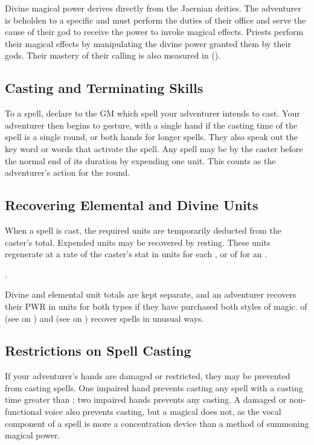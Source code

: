 \begin{multicols*}{2}
Divine magical power derives directly from the Jaernian deities. The adventurer is beholden to a specific  and must perform the duties of their office and serve the cause of their god to receive the power to invoke magical effects. Priests perform their magical effects by manipulating the divine power granted them by their gods. Their mastery of their calling is also measured in  (\DU).
\subsection{Casting and Terminating Skills}
To  a spell, declare to the GM which spell your adventurer intends to cast. Your adventurer then begins to gesture, with a single hand if the casting time of the spell is a single round, or both hands for longer spells. They also speak out the key word or words that activate the spell. Any spell may be  by the caster before
the normal end of its duration by expending one unit. This counts as the adventurer's action for the round.
\subsection{Recovering Elemental and Divine Units}
When a spell is cast, the required units are temporarily deducted from the caster's total. Expended units may be recovered by resting. These units regenerate at a rate of the caster's \PWR stat in units for each  , or  of  for an .

. 

Divine and elemental unit totals are kept separate, and an adventurer recovers their PWR in units for both types if they have purchased both styles of magic.  of  (see  on \pageref{ch:rudri}) and  (see  on \pageref{ch:rudri}) recover spells in unusual ways.
\subsection{Restrictions on Spell Casting}
If your adventurer's hands are damaged or restricted, they may be prevented from casting spells. One impaired hand prevents casting any spell with a casting time greater than ; two impaired hands prevents any casting. A damaged or non-functional voice also prevents casting, but a magical  does not, as the vocal component of a spell is more a concentration device than a method of summoning magical power. 


\end{multicols*}
